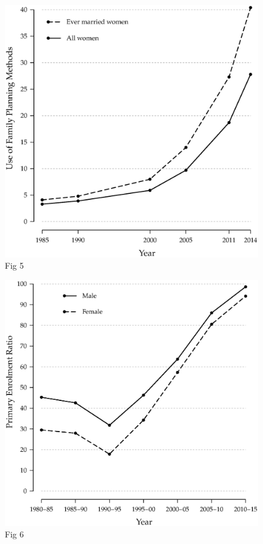 \documentclass[a4paper, twocolumn]{article}
\begin{document}
\lipsum[4]


\begin{figure}[!hbtp]
\includegraphics[width = \columnwidth]{../figures/fig5.eps}
\caption{Fig 5}
\end{figure}

\lipsum[1]

\begin{figure}[!hbtp]
\includegraphics[width = \columnwidth]{../figures/fig6.eps}
\caption{Fig 6}
\end{figure}
\end{document}
